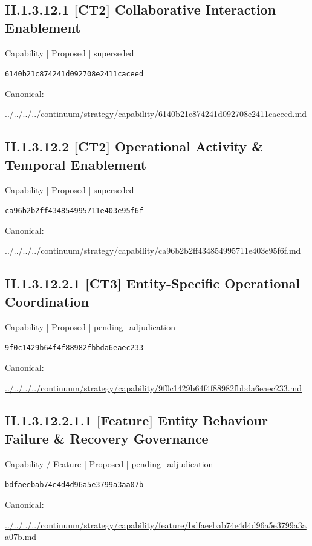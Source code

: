 \documentclass[10pt,a4paper]{article}
\begin{document}
\subsection*{II.1.3.12.1 [CT2] Collaborative Interaction Enablement}
{\small Capability | Proposed | superseded}\par
\texttt{6140b21c874241d092708e2411caceed}\par
Canonical: \par
{\footnotesize\url{../../../../continuum/strategy/capability/6140b21c874241d092708e2411caceed.md}}\par
\subsection*{II.1.3.12.2 [CT2] Operational Activity \& Temporal Enablement}
{\small Capability | Proposed | superseded}\par
\texttt{ca96b2b2ff434854995711e403e95f6f}\par
Canonical: \par
{\footnotesize\url{../../../../continuum/strategy/capability/ca96b2b2ff434854995711e403e95f6f.md}}\par
\subsection*{II.1.3.12.2.1 [CT3] Entity-Specific Operational Coordination}
{\small Capability | Proposed | pending\_adjudication}\par
\texttt{9f0c1429b64f4f88982fbbda6eaec233}\par
Canonical: \par
{\footnotesize\url{../../../../continuum/strategy/capability/9f0c1429b64f4f88982fbbda6eaec233.md}}\par
\subsection*{II.1.3.12.2.1.1 [Feature] Entity Behaviour Failure \& Recovery Governance}
{\small Capability / Feature | Proposed | pending\_adjudication}\par
\texttt{bdfaeebab74e4d4d96a5e3799a3aa07b}\par
Canonical: \par
{\footnotesize\url{../../../../continuum/strategy/capability/feature/bdfaeebab74e4d4d96a5e3799a3aa07b.md}}\par
\end{document}
